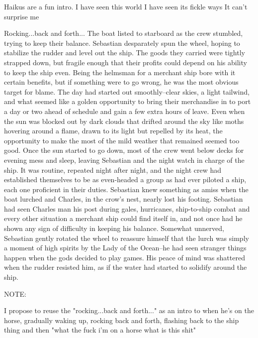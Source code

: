 
Haikus are a fun intro.
I have seen this world
I have seen its fickle ways
It can't surprise me

Rocking...back and forth...
The boat listed to starboard as the crew stumbled, trying to keep their balance.  Sebastian desparately spun the wheel, hoping to stabilize the rudder and level out the ship. The goods they carried were tightly strapped down, but fragile enough that their profits could depend on his ability to keep the ship even.  Being the helmsman for a merchant ship bore with it certain benefits, but if something were to go wrong, he was the most obvious target for blame.  
The day had started out smoothly--clear skies, a light tailwind, and what seemed like a golden opportunity to bring their merchandise in to port a day or two ahead of schedule and gain a few extra hours of leave.  Even when the sun was blocked out by dark clouds that drifted around the sky like moths hovering around a flame, drawn to its light but repelled by its heat, the opportunity to make the most of the mild weather that remained seemed too good. 
Once the sun started to go down, most of the crew went below decks for evening mess and sleep, leaving Sebastian and the night watch in charge of the ship.  It was routine, repeated night after night, and the night crew had established themselves to be as even-headed a group as had ever piloted a ship, each one proficient in their duties.  Sebastian knew something as amiss when the boat lurched and Charles, in the crow's nest, nearly lost his footing.  Sebastian had seen Charles man his post during gales, hurricanes, ship-to-ship combat and every other situation a merchant ship could find itself in, and not once had he shown any sign of difficulty in keeping his balance.  Somewhat unnerved, Sebastian gently rotated the wheel to reassure himself that the lurch was simply a moment of high spirits by the Lady of the Ocean--he had seen stranger things happen when the gods decided to play games.  His peace of mind was shattered when the rudder resisted him, as if the water had started to solidify around the ship.

NOTE:

I propose to reuse the "rocking...back and forth..." as an intro to when he's on the horse, gradually waking up, rocking back and forth, flashing back to the ship thing and then "what the fuck i'm on a horse what is this shit"



                                                        
